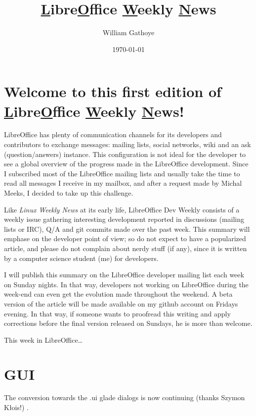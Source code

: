 \documentclass{article}
\begin{document}
\title{\underline{L}ibre\underline{O}ffice \underline{W}eekly \underline{N}ews}
\author{William Gathoye}
\date{\today}
\maketitle


\section{Welcome to this first edition of \underline{L}ibre\underline{O}ffice \underline{W}eekly \underline{N}ews!}

LibreOffice has plenty of communication channels for its developers and contributors to exchange messages: mailing lists, social networks, wiki and an ask (question/answers) instance. This configuration is not ideal for the developer to see a global overview of the progress made in the LibreOffice development. Since I subscribed most of the LibreOffice mailing lists and usually take the time to read all messages I receive in my mailbox, and after a request made by Michal Meeks, I decided to take up this challenge.

Like \emph{Linux Weekly News} at its early life, LibreOffice Dev Weekly consists of a weekly issue gathering interesting development reported in discussions (mailing lists or IRC), Q/A and git commits made over the past week. This summary will emphase on the developer point of view; so do not expect to have a popularized article, and please do not complain about nerdy stuff (if any), since it is written by a computer science student (me) for developers. 

I will publish this summary on the LibreOffice developer mailing list each week on Sunday nights. In that way, developers not working on LibreOffice during the week-end can even get the evolution made throughout the weekend. A beta version of the article will be made available on my github account\cite{wgetGithub} on Fridays evening. In that way, if someone wants to proofread this writing and apply corrections before the final version released on Sundays, he is more than welcome.

This week in LibreOffice\ldots

\section{GUI}

The conversion towards the .ui glade dialogs is now continuing (thanks Szymon Kłois!) \cite{gladeUi1,gladeUi2,gladeUi3}.
\end{document}
